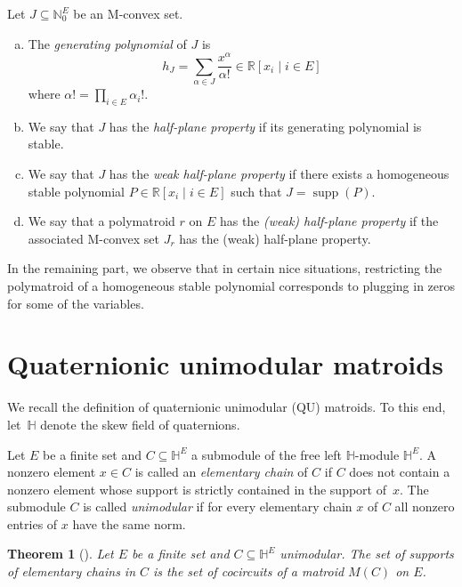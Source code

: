 \documentclass[11pt]{article}
\newtheorem{thm}[theo]{Theorem}
\theoremstyle{definition}
\numberwithin{equation}{section}
\newcommand{\N}{{\mathbb N}}
\newcommand{\R}{{\mathbb R}}
\newcommand{\HH}{{\mathbb H}}
\newcommand{\supp}{\operatorname{supp}}
\begin{document}
\begin{Def}
    Let $J\subseteq\N_0^E$ be an M-convex set.
    \begin{enumerate}[(a)]
        \item The \emph{generating polynomial} of $J$ is
        \begin{equation*}
            h_J=\sum_{\alpha\in J}\frac{x^\alpha}{\alpha!}\in \R[x_i\mid i\in E]
        \end{equation*}
        where $\alpha!=\prod_{i\in E}\alpha_i!$.
        \item We say that $J$ has the \emph{half-plane property} if its generating polynomial is stable.
        \item We say that $J$ has the \emph{weak half-plane property} if there exists a homogeneous stable polynomial $P\in\R[x_i\mid i\in E]$ such that $J=\supp(P)$.
        \item We say that a polymatroid $r$ on $E$ has the \emph{(weak) half-plane property} if the associated M-convex set $J_r$ has the (weak) half-plane property.
    \end{enumerate}
\end{Def}

In the remaining part, we observe that in certain nice situations, restricting the polymatroid of a homogeneous stable polynomial corresponds to plugging in zeros for some of the variables.

\section{Quaternionic unimodular matroids}\label{sec:qu}
We recall the definition of quaternionic unimodular (QU) matroids. To this end, let~$\HH$ denote the skew field of quaternions.

\begin{Def}
    Let $E$ be a finite set and $C\subseteq\HH^E$ a submodule of the free left $\HH$-module $\HH^E$. A nonzero element $x\in C$ is called an \emph{elementary chain} of $C$ if $C$ does not contain a nonzero element whose support is strictly contained in the support of~$x$. The submodule $C$ is called \emph{unimodular} if for every elementary chain $x$ of $C$ all nonzero entries of $x$ have the same norm.
\end{Def}

\begin{thm}[{\cite[Theorem~3.7]{skewpartial}}]
    Let $E$ be a finite set and $C\subseteq\HH^E$ unimodular. The set of supports of elementary chains in $C$ is the set of cocircuits of a matroid $M(C)$ on $E$.
\end{thm}
\end{document}
